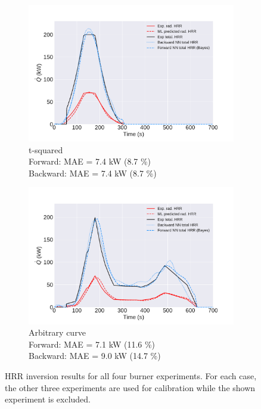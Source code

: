 \documentclass{article}
\begin{document}
\begin{figure}[htbp]
\begin{subfigure}[t]{.45\textwidth}
  \end{subfigure}
   \begin{subfigure}[t]{.45\textwidth}
      \centering
      \includegraphics[width=\textwidth ,keepaspectratio]{figures/t_squared_final.pdf}
      \caption{t-squared \\ Forward: MAE = 7.4 kW (8.7 \%) \\ Backward: MAE = 7.4 kW (8.7 \%)}
      \label{fig:final_result_t_squared}
  \end{subfigure}
    \begin{subfigure}[t]{.45\textwidth}
      \centering
      \includegraphics[width=\textwidth ,keepaspectratio]{figures/weird_curve_final.pdf}
      \caption{Arbitrary curve \\ Forward: MAE = 7.1 kW (11.6 \%) \\ Backward: MAE = 9.0 kW (14.7 \%)}
      \label{fig:final_result_weird_curve}
  \end{subfigure}
  \caption{HRR inversion results for all four burner experiments. For each case, the other three experiments are used for calibration while the shown experiment is excluded.} 
  \label{fig:final_burner_results}
\end{figure}
\end{document}
